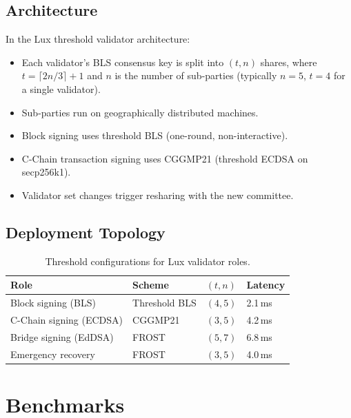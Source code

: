 \documentclass[11pt,a4paper]{article}
\begin{document}
\subsection{Architecture}

In the Lux threshold validator architecture:

\begin{itemize}[leftmargin=2em]
  \item Each validator's BLS consensus key is split into $(t, n)$ shares, where
        $t = \lceil 2n/3 \rceil + 1$ and $n$ is the number of sub-parties
        (typically $n = 5$, $t = 4$ for a single validator).
  \item Sub-parties run on geographically distributed machines.
  \item Block signing uses threshold BLS (one-round, non-interactive).
  \item C-Chain transaction signing uses CGGMP21 (threshold ECDSA on secp256k1).
  \item Validator set changes trigger resharing with the new committee.
\end{itemize}

\subsection{Deployment Topology}

\begin{table}[ht]
\centering
\caption{Threshold configurations for Lux validator roles.}
\label{tab:configurations}
\begin{tabular}{llll}
\toprule
\textbf{Role} & \textbf{Scheme} & \textbf{$(t, n)$} & \textbf{Latency} \\
\midrule
Block signing (BLS) & Threshold BLS & $(4, 5)$ & 2.1\,ms \\
C-Chain signing (ECDSA) & CGGMP21 & $(3, 5)$ & 4.2\,ms \\
Bridge signing (EdDSA) & FROST & $(5, 7)$ & 6.8\,ms \\
Emergency recovery & FROST & $(3, 5)$ & 4.0\,ms \\
\bottomrule
\end{tabular}
\end{table}

\section{Benchmarks}
\label{sec:benchmarks}
\end{document}
